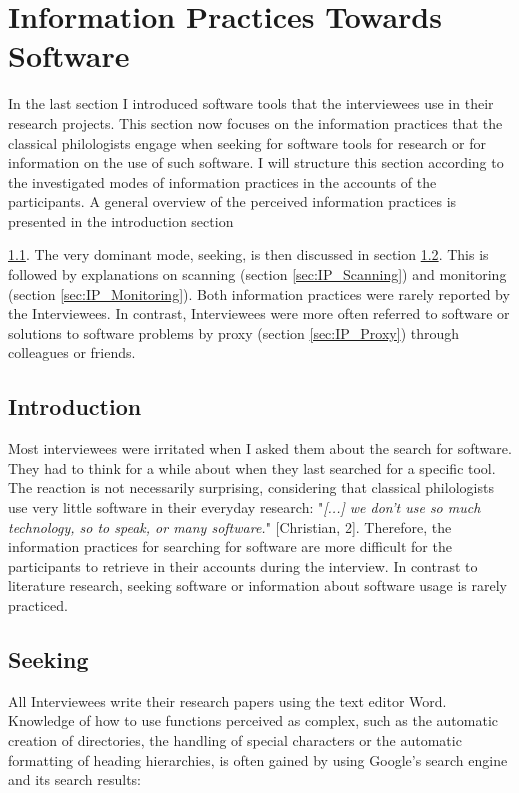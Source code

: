 \documentclass[12pt, a4paper, titlepage, oneside, abstract=true, toc=listof, toc=bibliography, BCOR=1cm]{scrreprt}
\begin{document}
\section{Information Practices Towards Software}
\label{sec:IP_SW}
In the last section I introduced software tools that the interviewees use in their research projects. This section now focuses on the information practices that the classical philologists engage when seeking for software tools for research or for information on the use of such software. I will structure this section according to the investigated modes of information practices in the accounts of the participants. A general overview of the perceived information practices is presented in the introduction section {\ref{sec:IP_Introduction}. The very dominant mode, seeking, is then discussed in section \ref{sec:IP_Seeking}. This is followed by explanations on scanning (section \ref{sec:IP_Scanning}) and monitoring (section \ref{sec:IP_Monitoring}). Both information practices were rarely reported by the Interviewees. In contrast, Interviewees were more often referred to software or solutions to software problems by proxy (section \ref{sec:IP_Proxy}) through colleagues or friends.

\subsection{Introduction}
\label{sec:IP_Introduction}
Most interviewees were irritated when I asked them about the search for software. They had to think for a while about when they last searched for a specific tool. The reaction is not necessarily surprising, considering that classical philologists use very little software in their everyday research: "\textit{[...] we don't use so much technology, so to speak, or many software.}" [Christian, 2]. Therefore, the information practices for searching for software are more difficult for the participants to retrieve in their accounts during the interview. In contrast to literature research, seeking software or information about software usage is rarely practiced. 

\subsection{Seeking}
\label{sec:IP_Seeking}
All Interviewees write their research papers using the text editor Word. Knowledge of how to use functions perceived as complex, such as the automatic creation of directories, the handling of special characters or the automatic formatting of heading hierarchies, is often gained by using Google's search engine and its search results:

}
\end{document}
